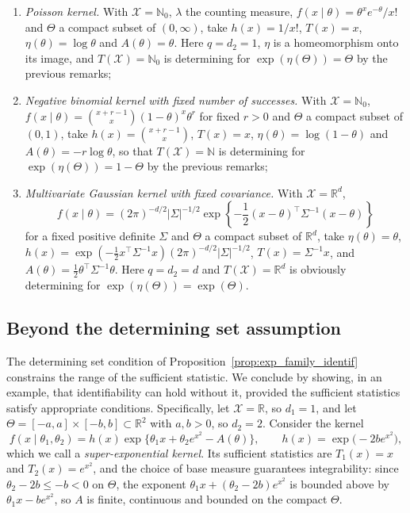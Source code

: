 \documentclass[11pt,twoside]{article} %
\begin{document}
\begin{enumerate}
    \item[(i)] \emph{Poisson kernel.} With $\mathcal X=\mathbb N_0$, $\lambda$ the counting measure, $f(x\mid\theta)=\theta^xe^{-\theta}/x!$ and $\Theta$ a compact subset of $(0,\infty)$, take $h(x)=1/x!$, $T(x)=x$, $\eta(\theta)=\log\theta$ and $A(\theta)=\theta$. Here $q=d_2=1$, $\eta$ is a homeomorphism onto its image, and $T(\mathcal X)=\mathbb N_0$ is determining for $\exp(\eta(\Theta))=\Theta$ by the previous remarks;

    \item[(ii)] \emph{Negative binomial kernel with fixed number of successes.} With $\mathcal X=\mathbb N_0$, $f(x\mid\theta)=\binom{x+r-1}{x}(1-\theta)^x\theta^r$ for fixed $r>0$ and $\Theta$ a compact subset of $(0,1)$, take $h(x)=\binom{x+r-1}{x}$, $T(x)=x$, $\eta(\theta)=\log(1-\theta)$ and $A(\theta)=-r\log\theta$, so that $T(\mathcal X)=\mathbb N$ is determining for $\exp(\eta(\Theta))=1-\Theta$ by the previous remarks;

    \item[(iii)] \emph{Multivariate Gaussian kernel with fixed covariance.} With $\mathcal X=\mathbb R^d$, $$f(x\mid\theta)=(2\pi)^{-d/2}|\Sigma|^{-1/2}\exp\left\{-\frac12(x-\theta)^\top\Sigma^{-1}(x-\theta)\right\}$$ for a fixed positive definite $\Sigma$ and $\Theta$ a compact subset of $\mathbb R^d$, take $\eta(\theta)=\theta$, $h(x)=\exp(-\frac12x^\top\Sigma^{-1}x) (2\pi)^{-d/2} |\Sigma|^{-1/2}$, $T(x)=\Sigma^{-1}x$, and $A(\theta)=\frac12\theta^\top\Sigma^{-1}\theta$. Here $q=d_2=d$ and $T(\mathcal X)=\mathbb R^d$ is obviously determining for $\exp(\eta(\Theta))=\exp(\Theta)$.
\end{enumerate}







\subsection{Beyond the determining set assumption}\label{sec:beyond}

The determining set condition of Proposition~\ref{prop:exp_family_identif} constrains the range of the sufficient statistic. We conclude by showing, in an example, that identifiability can hold without it, provided the sufficient statistics satisfy appropriate conditions. %
Specifically, let $\mathcal X=\mathbb R$, so $d_1=1$, and let $\Theta=[-a,a]\times[-b,b]\subset\mathbb R^2$ with $a,b>0$, so $d_2=2$. Consider the kernel
%
\begin{equation}\label{eq:super_exponential}
    f(x\mid\theta_1,\theta_2)=h(x)\exp\big\{\theta_1x+\theta_2e^{x^2}-A(\theta)\big\},\qquad h(x)=\exp\big(-2be^{x^2}\big),
\end{equation}
%
which we call a \emph{super-exponential kernel}. Its sufficient statistics are $T_1(x)=x$ and $T_2(x)=e^{x^2}$, and the choice of base measure guarantees integrability: since $\theta_2-2b\le-b<0$ on $\Theta$, the exponent $\theta_1x+(\theta_2-2b)e^{x^2}$ is bounded above by $\theta_1x-be^{x^2}$, so $A$ is finite, continuous and bounded on the compact $\Theta$.
\end{document}

